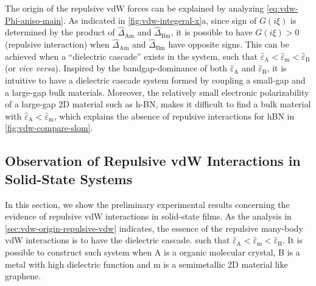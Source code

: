 The origin of the repulsive vdW forces can be explained by analyzing
\autoref{eq:vdw-Phi-aniso-main}.
%
As indicated in \autoref{fig:vdw-integeral-x}a, since sign of
$G(i \xi)$ is determined by the product of
$\hat{\Delta}_{\mathrm{Am}}$ and $\hat{\Delta}_{\mathrm{Bm}}$, it is
possible to have $G(i \xi) > 0$ (repulsive interaction) when
$\hat{\Delta}_{\mathrm{Am}}$ and $\hat{\Delta}_{\mathrm{Bm}}$ have
opposite signs.
%
This can be achieved when a ``dielectric cascade'' exists in the
system, such that
\(\hat{\varepsilon}_{\mathrm{A}} < \hat{\varepsilon}_{\mathrm{m}} <
\hat{\varepsilon}_{\mathrm{B}}\) (or \emph{vice versa}).
%
Inspired by the bandgap-dominance of both
\(\hat{\varepsilon}_{\mathrm{A}}\) and
\(\hat{\varepsilon}_{\mathrm{B}}\), it is intuitive to have a
dielectric cascade system formed by coupling a small-gap and a
large-gap bulk materials.
%
Moreover, the relatively small electronic polarizability of a
large-gap 2D material such as h-BN, makes it difficult to find a bulk
material with
\(\hat{\varepsilon}_{\mathrm{A}} < \hat{\varepsilon}_{\mathrm{m}}\),
which explains the absence of repulsive interactions for hBN in
\autoref{fig:vdw-compare-slom}.
%

\subsection{Observation of Repulsive vdW Interactions in Solid-State Systems}
\label{sec:vdw-observ-repuls-vdw}


In this section, we show the preliminary experimental results
concerning the evidence of repulsive vdW interactions in solid-state
films.
%
As the analysis in \autoref{sec:vdw-origin-repulsive-vdw} indicates,
the essence of the repulsive many-body vdW interactions is to have the
dielectric cascade.
such that $\hat{\varepsilon}_{\mathrm{A}} < \hat{\varepsilon}_{\mathrm{m}} <
\hat{\varepsilon}_{\mathrm{B}}$.
%
It is possible to construct such system when A is a organic molecular
crystal, B is a metal with high dielectric function and m is a
semi\-metallic 2D material like graphene.

